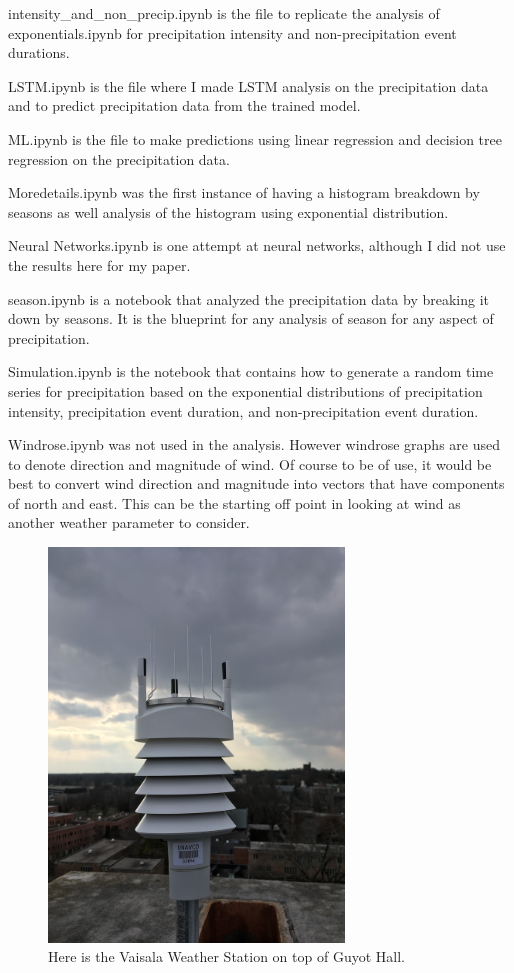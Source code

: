 \documentclass[11pt]{report}
\begin{document}
	intensity\_and\_non\_precip.ipynb is the file to replicate the analysis of exponentials.ipynb for precipitation intensity and non-precipitation event durations. 
	
	LSTM.ipynb is the file where I made LSTM analysis on the precipitation data and to predict precipitation data from the trained model. 
	
	ML.ipynb is the file to make predictions using linear regression and decision tree regression on the precipitation data. 
	
	Moredetails.ipynb was the first instance of having a histogram breakdown by seasons as well analysis of the histogram using exponential distribution. 
	
	Neural Networks.ipynb is one attempt at neural networks, although I did not use the results here for my paper. 
	
	season.ipynb is a notebook that analyzed the precipitation data by breaking it down by seasons. It is the blueprint for any analysis of season for any aspect of precipitation. 
	
	Simulation.ipynb is the notebook that contains how to generate a random time series for precipitation based on the exponential distributions of precipitation intensity, precipitation event duration, and non-precipitation event duration.   
	
	Windrose.ipynb was not used in the analysis. However windrose graphs are used to denote direction and magnitude of wind. Of course to be of use, it would be best to convert wind direction and magnitude into vectors that have components of north and east. This can be the starting off point in looking at wind as another weather parameter to consider. 
	
	\begin{figure}[h]
		\centering
		\includegraphics[width = 0.7\textwidth]{Figures/weather_station.jpg}
		\caption[Vaisala Weather Station]{
			Here is the Vaisala Weather Station on top of Guyot Hall.  
		}
	\end{figure}
	
\end{document}
